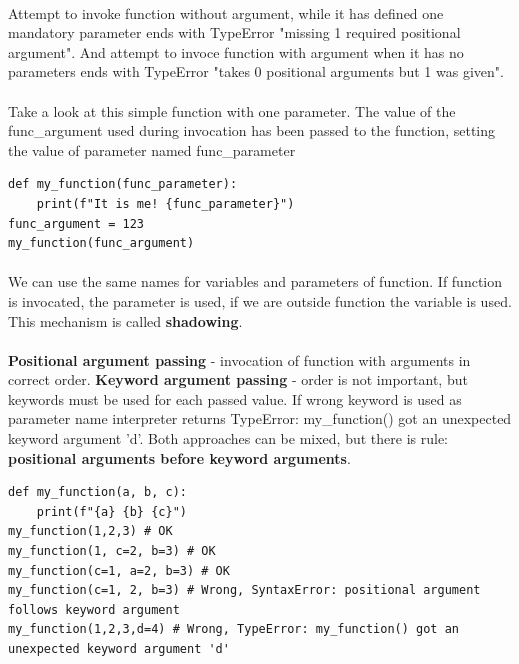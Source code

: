 \documentclass{article}
\begin{document}
	\paragraph{}
	Attempt to invoke function without argument, while it has defined one mandatory parameter ends with \textcolor{pythonerror}{TypeError "missing 1 required positional argument"}. And attempt to invoce function with argument when it has no parameters ends with \textcolor{pythonerror}{TypeError "takes 0 positional arguments but 1 was given"}.
	\paragraph{}
	Take a look at this simple function with one parameter. The value of the func\_argument used during invocation has been passed to the function, setting the value of parameter named func\_parameter
	\begin{lstlisting}[style=pystyle]
def my_function(func_parameter):
	print(f"It is me! {func_parameter}")
func_argument = 123
my_function(func_argument)
	\end{lstlisting}
	\paragraph{}
	We can use the same names for variables and parameters of function. If function is invocated, the parameter is used, if we are outside function the variable is used. This mechanism is called \textbf{shadowing}.
	\paragraph{}
	\textbf{Positional argument passing} - invocation of function with arguments in correct order. \textbf{Keyword argument passing} - order is not important, but keywords must be used for each passed value. If wrong keyword is used as parameter name interpreter returns \textcolor{pythonerror}{TypeError: my\_function() got an unexpected keyword argument 'd'}. Both approaches can be mixed, but there is rule: \textbf{positional arguments before keyword arguments}.
	\begin{lstlisting}[style=pystyle]
def my_function(a, b, c):
	print(f"{a} {b} {c}")
my_function(1,2,3) # OK
my_function(1, c=2, b=3) # OK
my_function(c=1, a=2, b=3) # OK
my_function(c=1, 2, b=3) # Wrong, SyntaxError: positional argument follows keyword argument
my_function(1,2,3,d=4) # Wrong, TypeError: my_function() got an unexpected keyword argument 'd'
	\end{lstlisting}
\end{document}
